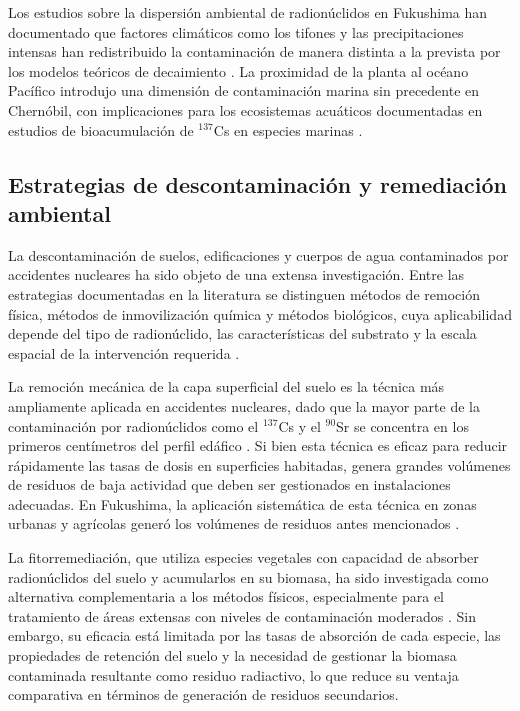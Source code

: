 Los estudios sobre la dispersión ambiental de radionúclidos en Fukushima han
documentado que factores climáticos como los tifones y las precipitaciones
intensas han redistribuido la contaminación de manera distinta a la prevista por
los modelos teóricos de decaimiento \cite{Saito}. La proximidad de la planta al
océano Pacífico introdujo una dimensión de contaminación marina sin precedente
en Chernóbil, con implicaciones para los ecosistemas acuáticos documentadas en
estudios de bioacumulación de $^{137}$Cs en especies marinas \cite{Buesseler2012}.

\subsection{Estrategias de descontaminación y remediación ambiental}

La descontaminación de suelos, edificaciones y cuerpos de agua contaminados por
accidentes nucleares ha sido objeto de una extensa investigación. Entre las
estrategias documentadas en la literatura se distinguen métodos de remoción
física, métodos de inmovilización química y métodos biológicos, cuya aplicabilidad
depende del tipo de radionúclido, las características del substrato y la escala
espacial de la intervención requerida \cite{Vandenhove2009}.

La remoción mecánica de la capa superficial del suelo es la técnica más ampliamente
aplicada en accidentes nucleares, dado que la mayor parte de la contaminación
por radionúclidos como el $^{137}$Cs y el $^{90}$Sr se concentra en los primeros
centímetros del perfil edáfico \cite{Vandenhove2009}. Si bien esta técnica es
eficaz para reducir rápidamente las tasas de dosis en superficies habitadas,
genera grandes volúmenes de residuos de baja actividad que deben ser gestionados
en instalaciones adecuadas. En Fukushima, la aplicación sistemática de esta
técnica en zonas urbanas y agrícolas generó los volúmenes de residuos antes
mencionados \cite{MOE2021}.

La fitorremediación, que utiliza especies vegetales con capacidad de absorber
radionúclidos del suelo y acumularlos en su biomasa, ha sido investigada como
alternativa complementaria a los métodos físicos, especialmente para el tratamiento
de áreas extensas con niveles de contaminación moderados \cite{Dushenkov2010}.
Sin embargo, su eficacia está limitada por las tasas de absorción de cada especie,
las propiedades de retención del suelo y la necesidad de gestionar la biomasa
contaminada resultante como residuo radiactivo, lo que reduce su ventaja comparativa
en términos de generación de residuos secundarios.


